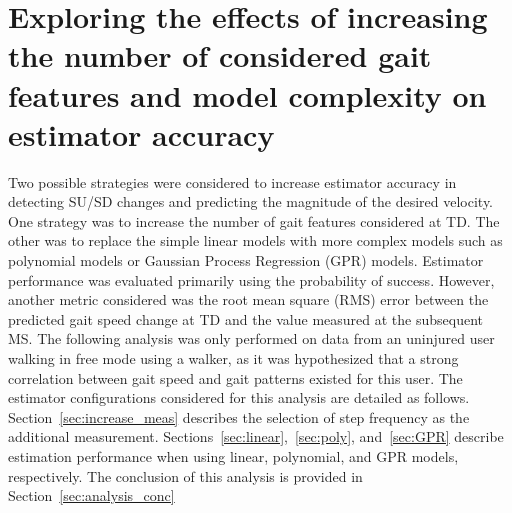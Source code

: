 \section{Exploring the effects of increasing the number of considered gait features and model complexity on estimator accuracy}\label{sec:add_analysis}

Two possible strategies were considered to increase estimator accuracy in detecting SU/SD changes and predicting the magnitude of the desired velocity. One strategy was to increase the number of gait features considered at TD. The other was to replace the simple linear models with more complex models such as polynomial models or Gaussian Process Regression (GPR) models. Estimator performance was evaluated primarily using the probability of success. However, another metric considered was the root mean square (RMS) error between the predicted gait speed change at TD and the value measured at the subsequent MS. The following analysis was only performed on data from an uninjured user walking in free mode using a walker, as it was hypothesized that a strong correlation between gait speed and gait patterns existed for this user. The estimator configurations considered for this analysis are detailed as follows. Section~\ref{sec:increase_meas} describes the selection of step frequency as the additional measurement. Sections~\ref{sec:linear},~\ref{sec:poly}, and~\ref{sec:GPR} describe estimation performance when using linear, polynomial, and GPR models, respectively. The conclusion of this analysis is provided in Section~\ref{sec:analysis_conc}
%
%
